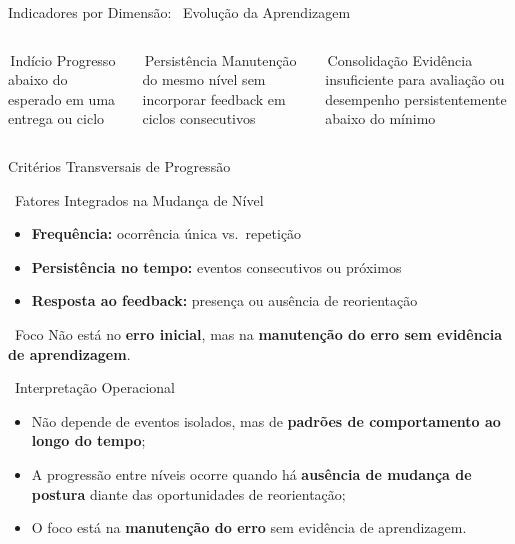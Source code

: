 \documentclass[xcolor=dvipsnames,table]{beamer}
\newcommand{\sazul}{\textcolor{NavyBlue}{\faCircle}\,}
\newcommand{\samarelo}{\textcolor{Goldenrod}{\faCircle}\,}
\newcommand{\svermelho}{\textcolor{BrickRed}{\faCircle}\,}
\begin{document}
  \begin{frame}[t]{Indicadores por Dimensão: \faChartLine\ Evolução da Aprendizagem}
    \begin{columns}
      \begin{block}{\centering \sazul Indício}
        \centering \scriptsize Progresso abaixo do esperado em uma entrega ou ciclo
      \end{block}
      \begin{alertblock}{\centering \samarelo Persistência}
        \centering \scriptsize Manutenção do mesmo nível sem incorporar feedback em ciclos
        consecutivos
      \end{alertblock}
      \begin{block}{\centering \svermelho Consolidação}
        \centering \scriptsize Evidência insuficiente para avaliação ou desempenho
        persistentemente abaixo do mínimo
      \end{block}
    \end{columns}
  \end{frame}

  \begin{frame}{Critérios Transversais de Progressão}
    \begin{block}{\faListUl\ Fatores Integrados na Mudança de Nível}
      \begin{itemize}
        \item[\faUndo] \textbf{Frequência:} ocorrência única vs.\ repetição
        \pause
        \item[\faCalendar] \textbf{Persistência no tempo:} eventos consecutivos ou próximos
        \pause
        \item[\faComments] \textbf{Resposta ao feedback:} presença ou ausência de reorientação
      \end{itemize}
    \end{block}
    \pause
    \begin{exampleblock}{\faBullseye\ Foco}
      Não está no \textbf{erro inicial}, mas na \textbf{manutenção do erro sem evidência de
      aprendizagem}.
    \end{exampleblock}
  \end{frame}

  \begin{frame}{\faBullseye\ Interpretação Operacional}
    \begin{block}{}
      \begin{itemize}
        \item Não depende de eventos isolados, mas de \textbf{padrões de comportamento ao longo
          do tempo};
        \pause
        \item A progressão entre níveis ocorre quando há \textbf{ausência de mudança de postura}
          diante das oportunidades de reorientação;
        \pause
        \item O foco está na \textbf{manutenção do erro} sem evidência de aprendizagem.
      \end{itemize}
    \end{block}
  \end{frame}
\end{document}
